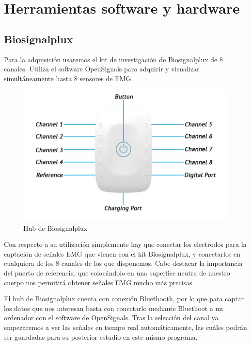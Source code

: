\chapter{Herramientas software y hardware}\label{sec:Herramienta_software _y _hardware}
\section{Biosignalplux}
Para la adquisición usaremos el kit de investigación de Biosignalplux de 8 canales. Utiliza el software OpenSignals para adquirir y visualizar simultáneamente hasta 8 sensores de EMG. \newline
\begin{figure}[H]
	\center
	\includegraphics[scale=0.8]{imagenes/Herramientas/Bios.jpg}
	\caption{Hub de Biosignalplux}
	\label{fig:Biosignalplux}
\end{figure}
Con respecto a su utilización simplemente hay que conectar los electrodos para la captación de señales EMG que vienen con el kit Biosignalplux, y conectarlos en cualquiera de los 8 canales de los que disponemos.  Cabe destacar la importancia del puerto de referencia, que colocándolo en una superfice neutra de nuestro cuerpo nos permitirá obtener señales EMG mucho más precisas. \newline 

El hub de Biosignalplux cuenta con conexión Bluethooth, por lo que para captar los datos que nos interesan basta con conectarlo mediante Bluethoot a un ordenador con el software de OpenSignals. Tras la selección del canal ya empezaremos a ver las señales en tiempo real automáticamente, las cuáles podrán ser guardadas para su posterior estudio en este mismo programa. \newline

